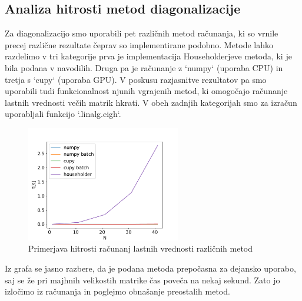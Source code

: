 \documentclass{article}
\begin{document}
\subsection{Analiza hitrosti metod diagonalizacije}
Za diagonalizacijo smo uporabili pet različnih metod računanja, ki so vrnile precej različne rezultate čeprav so implementirane podobno. Metode lahko razdelimo v tri kategorije prva je implementacija Householderjeve metoda, ki je bila podana v navodilih. Druga pa je računanje z `numpy` (uporaba CPU) in tretja s `cupy` (uporaba GPU). V poskusu razjasnitve rezultatov pa smo uporabili tudi funkcionalnost njunih vgrajenih metod, ki omogočajo računanje lastnih vrednosti večih matrik hkrati. V obeh zadnjih kategorijah smo za izračun uporabljali funkcijo `.linalg.eigh`. 

\begin{figure}[H]
    \centering
	\includegraphics[width=0.6\textwidth]{householder.pdf}
    \caption{Primerjava hitrosti računanj lastnih vrednosti različnih metod}
\end{figure}

Iz grafa se jasno razbere, da je podana metoda prepočasna za dejansko uporabo, saj se že pri majhnih velikostih matrike čas poveča na nekaj sekund. Zato jo izločimo iz računanja in poglejmo obnašanje preostalih metod.
\end{document}
